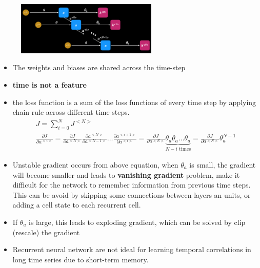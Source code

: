 \documentclass[a4paper,10pt]{article}
\begin{document}
\vspace*{-0.3cm}
\begin{figure}[ht]
    \centering
    \includegraphics[width =0.6\textwidth]{RC.png}
\end{figure}

\begin{itemize}
    \item The weights and biases are shared across the time-step
    \item \textbf{time is not a feature}
    \item the loss function is a sum of the loss functions of every time step by applying chain rule across different time steps. 
        \begin{gather*}
            J = \sum_{i=0}^{N}J^{<N>}\\
            \frac{\partial J}{\partial a^{<i>}} = \frac{\partial J}{\partial a^{<N>}}\frac{\partial a^{<N>}}{\partial a^{<N-1>}}\dots\frac{\partial a^{<i+1>}}{\partial a^{<i>}} = \frac{\partial J}{\partial a^{<N>}}\underbrace{\theta_a\theta_a\dots\theta_a}_{N-i\text{ times}} = \frac{\partial J}{\partial a^{<N>}}\theta_a^{N-1}
        \end{gather*}
    \item Unstable gradient occurs from above equation, when $\theta_a$ is small, the gradient will become smaller and leads to \textbf{vanishing gradient} problem,  make it difficult for the network to remember information from previous time steps. This can be avoid by skipping some connections between layers an units, or adding a cell state to each recurrent cell. 
    \item If $\theta_a$ is large, this leads to exploding gradient, which can be solved by clip (rescale) the gradient
    \item Recurrent neural network are not ideal for learning temporal correlations in long time series due to short-term memory. 
\end{itemize}
\end{document}

